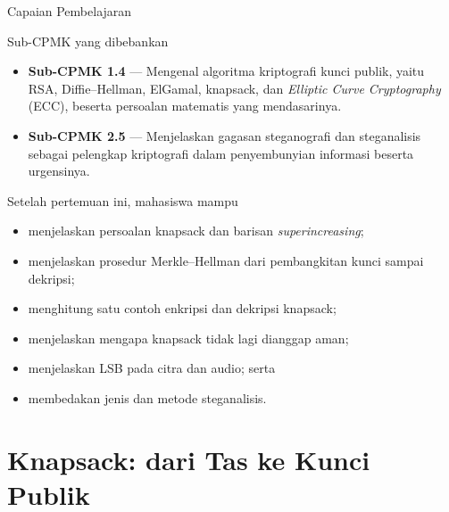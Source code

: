 \documentclass[aspectratio=169,11pt]{beamer}
\begin{document}
\begin{frame}{Capaian Pembelajaran}
    \begin{block}{Sub-CPMK yang dibebankan}
        \footnotesize
        \begin{itemize}
            \item \textbf{Sub-CPMK 1.4} --- Mengenal algoritma kriptografi
                  kunci publik, yaitu RSA, Diffie--Hellman, ElGamal, knapsack,
                  dan \textit{Elliptic Curve Cryptography} (ECC), beserta
                  persoalan matematis yang mendasarinya.
            \item \textbf{Sub-CPMK 2.5} --- Menjelaskan gagasan steganografi
                  dan steganalisis sebagai pelengkap kriptografi dalam
                  penyembunyian informasi beserta urgensinya.
        \end{itemize}
    \end{block}
    \vspace{0.1cm}
    \begin{exampleblock}{Setelah pertemuan ini, mahasiswa mampu}
        \footnotesize
        \begin{itemize}
            \item menjelaskan persoalan knapsack dan barisan
                  \textit{superincreasing};
            \item menjelaskan prosedur Merkle--Hellman dari pembangkitan kunci
                  sampai dekripsi;
            \item menghitung satu contoh enkripsi dan dekripsi knapsack;
            \item menjelaskan mengapa knapsack tidak lagi dianggap aman;
            \item menjelaskan LSB pada citra dan audio; serta
            \item membedakan jenis dan metode steganalisis.
        \end{itemize}
    \end{exampleblock}
\end{frame}

\section{Knapsack: dari Tas ke Kunci Publik}
\end{document}

